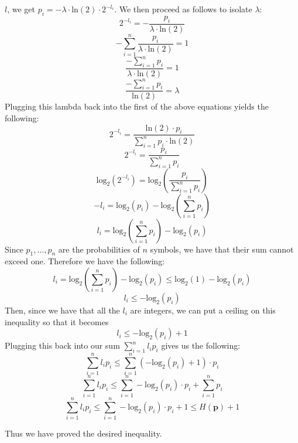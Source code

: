 \documentclass{article}
\begin{document}
\begin{description}
        $l$, we get $p_i = -\lambda \cdot \text{ln}(2) \cdot 2^{-l_i}$. We then
        proceed as follows to isolate $\lambda$:
        \[ 2^{-l_i} = -\frac{p_i}{\lambda \cdot \text{ln}(2)} \]
        \[ -\sum_{i=1}^n \frac{p_i}{\lambda \cdot \text{ln}(2)} = 1 \]
        \[ \frac{-\sum_{i=1}^n p_i}{\lambda \cdot \text{ln}(2)} = 1 \]
        \[ \frac{-\sum_{i=1}^n p_i}{\text{ln}(2)} = \lambda \]
        Plugging this lambda back into the first of the above equations yields the following:
        \[ 2^{-l_i} = \frac{\text{ln}(2) \cdot p_i}{\sum_{i=1}^n p_i \cdot \text{ln}(2)} \]
        \[ 2^{-l_i} = \frac{p_i}{\sum_{i=1}^n p_i} \]
        \[ \text{log}_2(2^{-l_i}) = \text{log}_2(\frac{p_i}{\sum_{i=1}^n p_i}) \]
        \[ -l_i = \text{log}_2(p_i) - \text{log}_2(\sum_{i=1}^n p_i) \]
        \[ l_i = \text{log}_2(\sum_{i=1}^n p_i) - \text{log}_2(p_i) \]
        Since $p_1, \dots, p_n$ are the probabilities of $n$ symbols, we have
        that their sum cannot exceed one. Therefore we have the following:
        \[ l_i = \text{log}_2(\sum_{i=1}^n p_i) - \text{log}_2(p_i) \leq \text{log}_2(1) - \text{log}_2(p_i)
        \]
        \[ l_i \leq -\text{log}_2(p_i) \]
        Then, since we have that all the $l_i$ are integers, we can put a
        ceiling on this inequality so that it becomes
        \[ l_i \leq -\text{log}_2(p_i) + 1 \]
        Plugging this back into our sum $\sum_{i=1}^n l_ip_i$ gives us the
        following:
        \[ \sum_{i=1}^n l_ip_i \leq \sum_{i=1}^n (-\text{log}_2(p_i) + 1) \cdot
        p_i \]
        \[ \sum_{i=1}^n l_ip_i \leq \sum_{i=1}^n -\text{log}_2(p_i) \cdot
        p_i + \sum_{i=1}^n p_i \]
        \[ \sum_{i=1}^n l_ip_i \leq \sum_{i=1}^n -\text{log}_2(p_i) \cdot
        p_i + 1 \leq H(\textbf{p}) + 1 \]

        Thus we have proved the desired inequality.
\end{description}
\newpage

\end{document}
